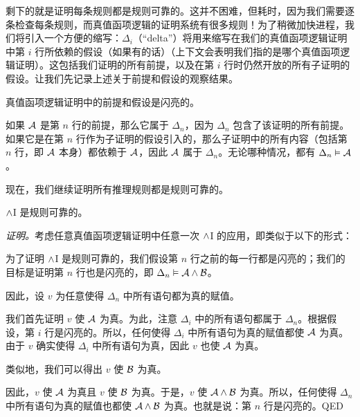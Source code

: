 剩下的就是证明每条规则都是规则可靠的。这并不困难，但耗时，因为我们需要逐条检查每条规则，而真值函项逻辑的证明系统有很多规则！为了稍微加快进程，我们将引入一个方便的缩写：$\Delta_i$（“delta”）将用来缩写在我们的真值函项逻辑证明中第 $i$ 行所依赖的假设（如果有的话）（上下文会表明我们指的是哪个真值函项逻辑证明）。这包括我们证明的所有前提，以及在第 $i$ 行时仍然开放的所有子证明的假设。让我们先记录上述关于前提和假设的观察结果。

\begin{factoidboxe}
	真值函项逻辑证明中的前提和假设是闪亮的。
\end{factoidboxe}

如果 $\mathcal{A}$ 是第 $n$ 行的前提，那么它属于 $\Delta_n$，因为 $\Delta_n$ 包含了该证明的所有前提。如果它是在第 $n$ 行作为子证明的假设引入的，那么子证明中的所有内容（包括第 $n$ 行，即 $\mathcal{A}$ 本身）都依赖于 $\mathcal{A}$，因此 $\mathcal{A}$ 属于 $\Delta_n$。无论哪种情况，都有 $\Delta_n \vDash \mathcal{A}$。

现在，我们继续证明所有推理规则都是规则可靠的。

\begin{factoidboxe}
$\wedge$I 是规则可靠的。
\end{factoidboxe}

\emph{证明。}考虑任意真值函项逻辑证明中任意一次 $\wedge$I 的应用，即类似于以下的形式：

\begin{fitchproof}
	 
\end{fitchproof}

\noindent
为了证明 $\wedge$I 是规则可靠的，我们假设第 $n$ 行之前的每一行都是闪亮的；我们的目标是证明第 $n$ 行也是闪亮的，即 $\Delta_n \vDash \mathcal{A} \wedge \mathcal{B}$。

因此，设 $v$ 为任意使得 $\Delta_{n}$ 中所有语句都为真的赋值。

我们首先证明 $v$ 使 $\mathcal{A}$ 为真。为此，注意 $\Delta_i$ 中的所有语句都属于 $\Delta_{n}$。根据假设，第 $i$ 行是闪亮的。所以，任何使得 $\Delta_i$ 中所有语句为真的赋值都使 $\mathcal{A}$ 为真。由于 $v$ 确实使得 $\Delta_i$ 中所有语句为真，因此 $v$ 也使 $\mathcal{A}$ 为真。

类似地，我们可以得出 $v$ 使 $\mathcal{B}$ 为真。

因此，$v$ 使 $\mathcal{A}$ 为真且 $v$ 使 $\mathcal{B}$ 为真。于是，$v$ 使 $\mathcal{A}\wedge\mathcal{B}$ 为真。所以，任何使得 $\Delta_{n}$ 中所有语句为真的赋值也都使 $\mathcal{A} \wedge \mathcal{B}$ 为真。也就是说：第 $n$ 行是闪亮的。\textsc{QED}

